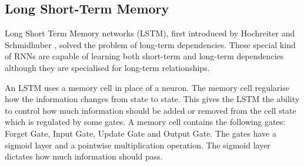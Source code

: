 \subsection{Long Short-Term Memory}

Long Short Term Memory networks (LSTM), first introduced by Hochreiter and Schmidhuber \cite{Hochreiter1997LONGMEMORY}, solved the problem of long-term dependencies. These special kind of RNNs are capable of learning both short-term and long-term dependencies although they are specialised for long-term relationships.



An LSTM uses a memory cell in place of a neuron. The memory cell regularise how the information changes from state to state. This gives the LSTM the ability to control how much information should be added or removed from the cell state which is regulated by some gates. A memory cell contains the following gates: Forget Gate, Input Gate, Update Gate and Output Gate. The gates have a sigmoid layer and a pointwise multiplication operation. The sigmoid layer dictates how much information should pass.